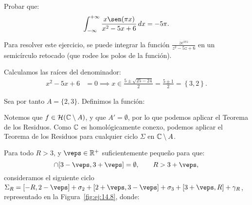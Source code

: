 \begin{ejercicio}\label{ej:14.8}
    Probar que:
    \begin{equation*}
        \int_{-\infty}^{+\infty} \frac{x\sen(\pi x)}{x^2-5x+6} \, dx = -5\pi.
    \end{equation*}
    \begin{observacion}
        Para resolver este ejercicio, se puede integrar la función $\frac{ze^{i\pi z}}{z^2-5z+6}$ en un semicírculo retocado (que rodee los polos de la función).
    \end{observacion}

    Calculamos las raíces del denominador:
    \begin{align*}
        x^2 - 5x + 6 &= 0 \implies x \in \frac{5\pm\sqrt{25 - 24}}{2} = \frac{5\pm 1}{2} = \left\{3, 2\right\}.
    \end{align*}

    Sea por tanto $A = \{2, 3\}$. Definimos la función:

    Notemos que $f\in \mathcal{H}(\mathbb{C}\setminus A)$, y que $A'=\emptyset$, por lo que podemos aplicar el Teorema de los Residuos. Como $\mathbb{C}$ es homológicamente conexo, podemos aplicar el Teorema de los Residuos para cualquier ciclo $\Sigma$ en $\mathbb{C}\setminus A$.

    Para todo $R > 3$, y $\veps\in \bb{R}^+$ suficientemente pequeño para que:
    \begin{equation*}
        [2-\veps, 2+\veps] \cap [3-\veps, 3+\veps] = \emptyset,
        \qquad R > 3 + \veps,
    \end{equation*}
    consideramos el siguiente ciclo $\Sigma_R = [-R, 2-\veps] + \sigma_{2} + [2+\veps, 3-\veps] + \sigma_{3} + [3+\veps, R] + \gamma_R$, representado en la Figura~\ref{fig:ej:14.8}, donde:
    \begin{figure}
        \centering
\end{figure}
\end{ejercicio}
